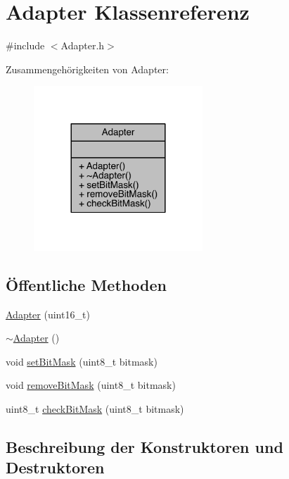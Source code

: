 \hypertarget{class_adapter}{}\section{Adapter Klassenreferenz}
\label{class_adapter}


{\ttfamily \#include $<$Adapter.\+h$>$}



Zusammengehörigkeiten von Adapter\+:\nopagebreak
\begin{figure}[H]
\begin{center}
\leavevmode
\includegraphics[width=180pt]{class_adapter__coll__graph}
\end{center}
\end{figure}
\subsection*{Öffentliche Methoden}
\begin{DoxyCompactItemize}
\item 
\hyperlink{class_adapter_ae2c6ad0390905b82cac4077642b36620}{Adapter} (uint16\+\_\+t)
\item 
\hyperlink{class_adapter_a08a07acff57eb40aba27455de23ed13c}{$\sim$\+Adapter} ()
\item 
void \hyperlink{class_adapter_adff950a92be7f52dbe08ff3af766a562}{set\+Bit\+Mask} (uint8\+\_\+t bitmask)
\item 
void \hyperlink{class_adapter_a655de45764223d7b1b3847170cc405a5}{remove\+Bit\+Mask} (uint8\+\_\+t bitmask)
\item 
uint8\+\_\+t \hyperlink{class_adapter_a8b1478082798b063a0c04d98fdea06a2}{check\+Bit\+Mask} (uint8\+\_\+t bitmask)
\end{DoxyCompactItemize}


\subsection{Beschreibung der Konstruktoren und Destruktoren}
\hypertarget{class_adapter_ae2c6ad0390905b82cac4077642b36620}{}\label{class_adapter_ae2c6ad0390905b82cac4077642b36620} 

